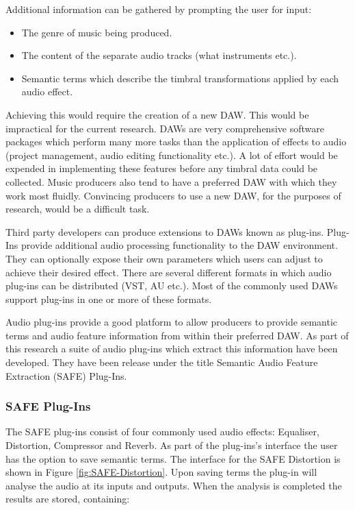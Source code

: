 			Additional information can be gathered by prompting the user for input:

			\begin{itemize}
				\item The genre of music being produced.
				\item The content of the separate audio tracks (what instruments etc.).
				\item Semantic terms which describe the timbral transformations applied by each audio
					effect.
			\end{itemize}

			Achieving this would require the creation of a new DAW. This would be impractical for the current
			research. DAWs are very comprehensive software packages which perform many more tasks than the
			application of effects to audio (project management, audio editing functionality etc.). A lot of
			effort would be expended in implementing these features before any timbral data could be collected.
			Music producers also tend to have a preferred DAW with which they work most fluidly. Convincing
			producers to use a new DAW, for the purposes of research, would be a difficult task.

			Third party developers can produce extensions to DAWs known as plug-ins. Plug-Ins provide additional
			audio processing functionality to the DAW environment. They can optionally expose their own
			parameters which users can adjust to achieve their desired effect. There are several different
			formats in which audio plug-ins can be distributed (VST, AU etc.). Most of the commonly used DAWs
			support plug-ins in one or more of these formats.

			Audio plug-ins provide a good platform to allow producers to provide semantic terms and audio
			feature information from within their preferred DAW. As part of this research a suite of audio
			plug-ins which extract this information have been developed. They have been release under the title
			Semantic Audio Feature Extraction (SAFE) Plug-Ins.

		\subsubsection{SAFE Plug-Ins}
			The SAFE plug-ins consist of four commonly used audio effects: Equaliser, Distortion, Compressor and
			Reverb. As part of the plug-ins's interface the user has the option to save semantic terms. The
			interface for the SAFE Distortion is shown in Figure \ref{fig:SAFE-Distortion}. Upon saving terms
			the plug-in will analyse the audio at its inputs and outputs. When the analysis is completed the
			results are stored, containing:

